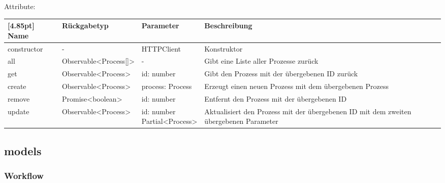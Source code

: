                 Attribute:
                \begin{center}
                \setlength\tabcolsep{5pt}
                	\renewcommand{\arraystretch}{1.5}
                    	\begin{tabularx}{\textwidth}{|l|l|l|X|}
                    	\hline
                    	\rowcolor[gray]{0.75}[4.85pt]
                		Name & Rückgabetyp & Parameter & Beschreibung \\ \hline 
                        constructor & - & HTTPClient & Konstruktor \\ \hline
                        all & Observable<Process[]> & - & Gibt eine Liste aller Prozesse zurück \\ \hline
                        get & Observable<Process> & id: number & Gibt den Prozess mit der übergebenen ID zurück \\ \hline
                        create & Observable<Process> & process: Process & Erzeugt einen neuen Prozess mit dem übergebenen Prozess \\ \hline
                        remove & Promise<boolean>  & id: number & Entfernt den Prozess mit der übergebenen ID \\ \hline
                        update & Observable<Process> & \thead{id: number\\Partial<Process>} & Aktualisiert den Prozess mit der übergebenen ID mit dem zweiten übergebenen Parameter \\ \hline
                	\end{tabularx}
                \end{center}
    
        \subsection{models}
            
    		\subsubsection{Workflow}
    		
